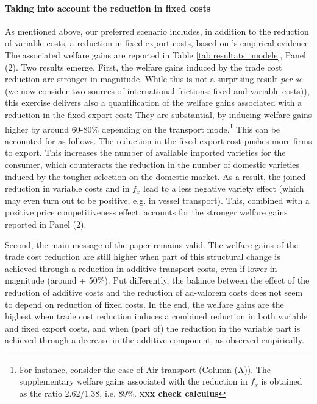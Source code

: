 \documentclass[a4paper,11pt]{article}
\begin{document}
\paragraph{Taking into account the reduction in fixed costs} As mentioned above, our preferred scenario includes, in addition to the reduction of variable costs, a reduction in fixed export costs, based on \cite{Lincoln_McCallum2018}’s empirical evidence.
The associated welfare gains are reported in Table \ref{tab:resultats_modele}, Panel (2).
Two results emerge.
First, the welfare gains induced by the trade cost reduction are stronger in magnitude.
While this is not a surprising result \textit{per se} (we now consider two sources of international frictions: fixed and variable costs)), this exercise delivers also a quantification of the welfare gains associated with a reduction in the fixed export cost: They are substantial, by inducing welfare gains higher by around 60-80\% depending on the transport mode.\footnote{For instance, consider the case of Air transport (Column (A)). The supplementary welfare gains associated with the reduction in $f_x$ is obtained as the ratio 2.62/1.38, i.e. 89\%. \textbf{xxx check calculus}} This can be accounted for as follows. The reduction in the fixed export cost pushes more firms to export.
This increases the number of available imported varieties for the consumer, which counteracts the reduction in the number of domestic varieties induced by the tougher selection on the domestic market.
As a result, the joined reduction in variable costs and in $f_x$ lead to a less negative variety effect (which may even turn out to be positive, e.g. in vessel transport). This, combined with a positive price competitiveness effect, accounts for the stronger welfare gains reported in Panel (2).

Second, the main message of the paper remains valid.
The welfare gains of the trade cost reduction are still higher when part of this structural change is achieved through a reduction in additive transport costs, even if lower in magnitude (around + 50\%). Put differently, the balance between the effect of the reduction of additive costs and the reduction of ad-valorem costs does not seem to depend on reduction of fixed costs. In the end, the welfare gains are the highest when trade cost reduction induces a combined reduction in both variable and fixed export costs, and when (part of) the reduction in the variable part is achieved through a decrease in the additive component, as observed empirically.\smallskip
\end{document}
